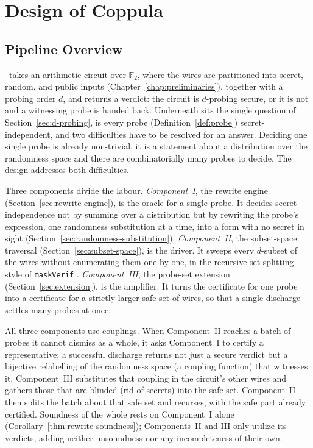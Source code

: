 \setlength{\parindent}{0pt}
\chapter{Design of Coppula}
\label{chap:design}
\section{Pipeline Overview}
\label{sec:pipeline-overview}

\toolname\ takes an arithmetic circuit over $\mathbb{F}_2$, where the wires
are partitioned into secret, random, and public inputs
(Chapter~\ref{chap:preliminaries}), together with a probing order $d$, and
returns a verdict: the circuit is $d$-probing secure, or it is not and a
witnessing probe is handed back. Underneath sits the single question of
Section~\ref{sec:d-probing}, is every probe (Definition~\ref{def:probe})
secret-independent, and two difficulties have to be resolved for an answer.
Deciding one single probe is already non-trivial, it is a statement
about a distribution over the randomness space and there are combinatorially many
probes to decide. The design addresses both difficulties.

Three components divide the labour. \emph{Component~I}, the rewrite engine
(Section~\ref{sec:rewrite-engine}), is the oracle for a single probe. It decides
secret-independence not by summing over a distribution but by rewriting the
probe's expression, one randomness substitution at a time, into a form with no secret in
sight (Section~\ref{sec:randomness-substitution}). \emph{Component~II}, the
subset-space traversal (Section~\ref{sec:subset-space}), is the driver. It sweeps
every $d$-subset of the wires without enumerating them one by one, in the
recursive set-splitting style of \texttt{maskVerif}
\parencite{10.1007/978-3-030-29959-0_15}. \emph{Component~III}, the probe-set
extension (Section~\ref{sec:extension}), is the amplifier. It turns the
certificate for one probe into a certificate for a strictly larger safe set of
wires, so that a single discharge settles many probes at once.

All three components use couplings. When Component~II reaches a batch of
probes it cannot dismiss as a whole, it asks Component~I to certify a
representative; a successful discharge returns not just a secure verdict but a
bijective relabelling of the randomness space (a coupling function) that
witnesses it. Component~III substitutes that coupling in the circuit's other
wires and gathers those that are blinded (rid of secrets) into the safe set. Component~II then
splits the batch about that safe set and recurses, with the safe part already
certified. Soundness of the whole rests on Component~I alone
(Corollary~\ref{thm:rewrite-soundness}); Components~II and III only utilize its
verdicts, adding neither unsoundness nor any incompleteness of their own.

